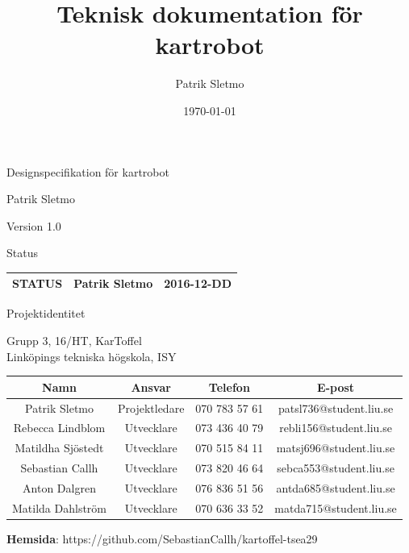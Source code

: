 \documentclass{article}
\title{Teknisk dokumentation för kartrobot}
\author{Patrik Sletmo}
\date{\today}
\begin{document}
\thispagestyle{empty}

{
\sffamily
\centering
\large


{\huge 
Designspecifikation för kartrobot
}

{\large
Patrik Sletmo
}

{\large
Version 1.0
}

\vspace{3.5cm}

Status
\begin{table}[H]
\centering
\begin{tabular}{ | c | c | c | }
\hline
STATUS & Patrik Sletmo & 2016-12-DD \\
\hline
\end{tabular}
\end{table}
}
\clearpage

\vspace*{\fill}
{
\sffamily
\centering
\large


{\huge
Projektidentitet
}

{\large
Grupp 3, 16/HT, KarToffel \\ Linköpings tekniska högskola, ISY
}

\vspace{0.5cm}

\begin{table}[H]
\centering
\begin{tabular}{ | c | c | c | c |}
\hline
Namn & Ansvar & Telefon & E-post \\
\hline
Patrik Sletmo & Projektledare & 070 783 57 61 & patsl736@student.liu.se \\
\hline
Rebecca Lindblom & Utvecklare & 073 436 40 79 & rebli156@student.liu.se \\
\hline
Matildha Sjöstedt & Utvecklare & 070 515 84 11 & matsj696@student.liu.se \\
\hline
Sebastian Callh & Utvecklare & 073 820 46 64 & sebca553@student.liu.se \\
\hline
Anton Dalgren & Utvecklare & 076 836 51 56 & antda685@student.liu.se \\
\hline
Matilda Dahlström & Utvecklare & 070 636 33 52 & matda715@student.liu.se \\
\hline
\end{tabular}
\end{table}
}

\begin{center}
\textbf{Hemsida}: https://github.com/SebastianCallh/kartoffel-tsea29
\end{center}
\end{document}

